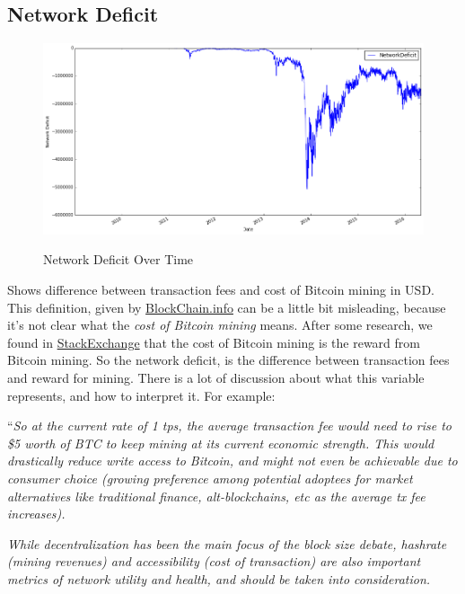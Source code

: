 \clearpage

\subsection{Network Deficit}
\label{sec:network-deficit}

\begin{figure}[bth]
  \myfloatalign
  {\includegraphics[width=1\linewidth]
    {gfx/network-deficit-over-time}}
  \caption{Network Deficit Over Time}
  \label{fig:network-deficit-over-time}
\end{figure}

Shows difference between transaction fees and cost of Bitcoin mining
in USD. This definition, given by
\href{https://blockchain.info/charts}{BlockChain.info} can be a little
bit misleading, because it's not clear what the \textit{cost of
  Bitcoin mining} means. After some research, we found in
\href{http://bitcoin.stackexchange.com/questions/10230/how-is-network-deficit-calculated}{StackExchange}
that the cost of Bitcoin mining is the reward from Bitcoin mining. So
the network deficit, is the difference between transaction fees and
reward for mining. There is a lot of discussion about what this
variable represents, and how to interpret it. For example:

``\textit{So at the current rate of 1 tps, the average transaction fee
  would need to rise to \$5 worth of BTC to keep mining at its current
  economic strength. This would drastically reduce write access to
  Bitcoin, and might not even be achievable due to consumer choice
  (growing preference among potential adoptees for market alternatives
  like traditional finance, alt-blockchains, etc as the average tx fee
  increases).}

\textit{While decentralization has been the main focus of the block
  size debate, hashrate (mining revenues) and accessibility (cost of
  transaction) are also important metrics of network utility and
  health, and should be taken into consideration.}


